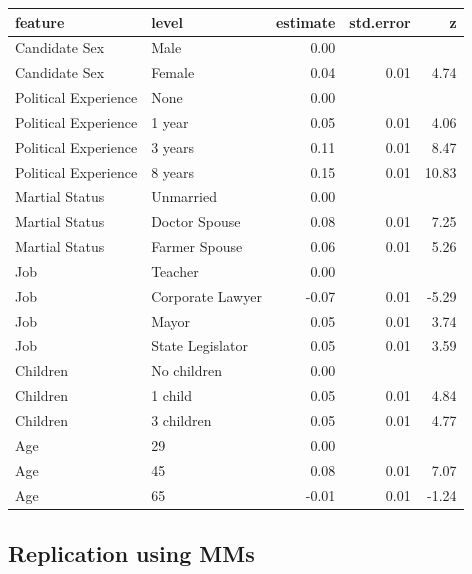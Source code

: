 \documentclass[a4paper,12pt]{article}\usepackage[]{graphicx}\usepackage[]{color}
\begin{document}
\clearpage

\begin{table}[ht]
\centering
\begin{tabular}{lp{1.5in}rrr}
  \hline
feature & level & estimate & std.error & z \\ 
  \hline
Candidate Sex & Male & 0.00 &  &  \\ 
  Candidate Sex & Female & 0.04 & 0.01 & 4.74 \\ 
  Political Experience & None & 0.00 &  &  \\ 
  Political Experience & 1 year & 0.05 & 0.01 & 4.06 \\ 
  Political Experience & 3 years & 0.11 & 0.01 & 8.47 \\ 
  Political Experience & 8 years & 0.15 & 0.01 & 10.83 \\ 
  Martial Status & Unmarried & 0.00 &  &  \\ 
  Martial Status & Doctor Spouse & 0.08 & 0.01 & 7.25 \\ 
  Martial Status & Farmer Spouse & 0.06 & 0.01 & 5.26 \\ 
  Job & Teacher & 0.00 &  &  \\ 
  Job & Corporate Lawyer & -0.07 & 0.01 & -5.29 \\ 
  Job & Mayor & 0.05 & 0.01 & 3.74 \\ 
  Job & State Legislator & 0.05 & 0.01 & 3.59 \\ 
  Children & No children & 0.00 &  &  \\ 
  Children & 1 child & 0.05 & 0.01 & 4.84 \\ 
  Children & 3 children & 0.05 & 0.01 & 4.77 \\ 
  Age & 29 & 0.00 &  &  \\ 
  Age & 45 & 0.08 & 0.01 & 7.07 \\ 
  Age & 65 & -0.01 & 0.01 & -1.24 \\ 
   \hline
\end{tabular}
\end{table}


\clearpage

\subsection{Replication using MMs}
\end{document}
